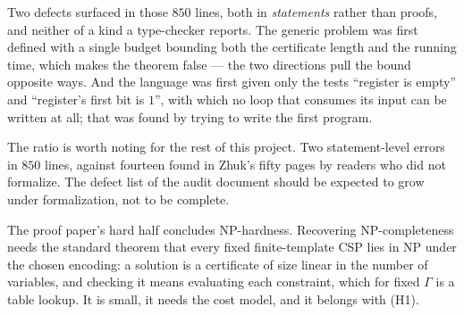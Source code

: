 \begin{remark}
\label{rem:complexity-defects}
Two defects surfaced in those $850$ lines, both in \emph{statements} rather
than proofs, and neither of a kind a type-checker reports. The generic problem
was first defined with a single budget bounding both the certificate length and
the running time, which makes the theorem false --- the two directions pull the
bound opposite ways. And the language was first given only the tests ``register
is empty'' and ``register's first bit is $1$'', with which no loop that
consumes its input can be written at all; that was found by trying to write the
first program.

The ratio is worth noting for the rest of this project. Two statement-level
errors in $850$ lines, against fourteen found in Zhuk's fifty pages by readers
who did not formalize. The defect list of the audit document should be expected
to grow under formalization, not to be complete.
\end{remark}

\begin{remark}\label{rem:np-membership}
The proof paper's hard half concludes \textup{NP}-hardness. Recovering
\textup{NP}-completeness needs the standard theorem that every fixed
finite-template CSP lies in \textup{NP} under the chosen encoding: a solution
is a certificate of size linear in the number of variables, and checking it
means evaluating each constraint, which for fixed $\Gamma$ is a table lookup.
It is small, it needs the cost model, and it belongs with \textup{(H1)}.
\end{remark}
